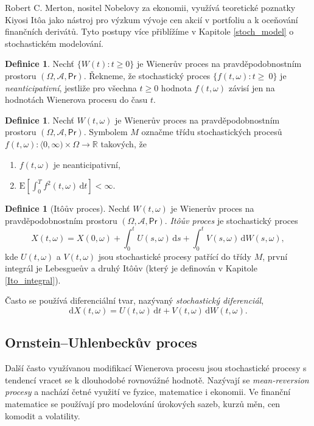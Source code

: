 \documentclass[a4paper,12pt]{report}
\theoremstyle{definition} \newtheorem{definice}[veta]{Definice}
\theoremstyle{remark}
\begin{document}
Robert C. Merton, nositel Nobelovy za ekonomii, využívá teoretické poznatky Kiyosi It\^oa jako nástroj pro výzkum vývoje cen akcií v portfoliu a k oceňování finančních derivátů.
Tyto postupy více přiblížíme v Kapitole \ref{stoch_model} o stochastickém modelování.

\begin{definice}
Nechť $\{W(t):t\ge0\}$ je Wienerův proces na pravděpodobnostním prostoru $(\Omega,\mathcal{A},\mathsf{Pr})$.
Řekneme, že stochastický proces $\{f(t,\omega):t\ge~0\}$ je \textit{neanticipativní}, jestliže pro všechna $t\ge0$ hodnota $f(t,\omega)$ závisí jen na hodnotách Wienerova procesu do času $t$.
\end{definice}

\begin{definice}\label{M}
Nechť $W(t,\omega)$ je Wienerův proces na pravděpodobnostním prostoru $(\Omega,\mathcal{A},\mathsf{Pr})$.
Symbolem $M$ označme třídu stochastických procesů \linebreak$f(t,\omega):\langle0,\infty)\times\Omega\to\mathbb R$ takových, že
\begin{enumerate}
\item $f(t,\omega)$ je neanticipativní, 
\item $\text{E}\left[\int_0^Tf^2(t,\omega)\,\mathrm{d}t\right]<\infty.$ 
\end{enumerate}
\end{definice}

\begin{definice}[It\^oův proces]
Nechť $W(t,\omega)$ je Wienerův proces na pravděpodobnostním prostoru $(\Omega,\mathcal{A},\mathsf{Pr})$.
\textit{It\^oův proces} je stochastický proces
$$X(t,\omega)=X(0,\omega)+\int_0^tU(s,\omega)\,\mathrm{d}s+\int_0^tV(s,\omega)\,\mathrm{d}W(s,\omega),$$
kde $U(t,\omega)$ a $V(t,\omega)$ jsou stochastické procesy patřící do třídy $M$,
první integrál je Lebesgueův a druhý It\^oův (který je definován v Kapitole \ref{Ito_integral}).

Často se používá diferenciální tvar, nazývaný \textit{stochastický diferenciál},
$$\mathrm{d}X(t,\omega)=U(t,\omega)\,\mathrm{d}t+V(t,\omega)\,\mathrm{d}W(t,\omega).$$
\end{definice}


\subsection{Ornstein–Uhlenbeckův proces}\label{OU_kap}
Další často využívanou modifikací Wienerova procesu jsou stochastické procesy s tendencí vracet se k dlouhodobé rovnovážné hodnotě.
Nazývají se \textit{mean-reversion procesy} a nachází četné využití ve fyzice, matematice i ekonomii.
Ve finanční matematice se používají pro modelování úrokových sazeb, kurzů měn, cen komodit a volatility.
\end{document}

